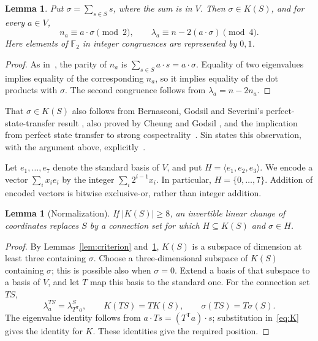 \documentclass[11pt]{article}
\newtheorem{lemma}[theorem]{Lemma}
\theoremstyle{definition}
\newcommand{\F}{\mathbb F}
\begin{document}
\begin{lemma}\label{lem:sigma}
Put $\sigma=\sum_{s\in S}s$, where the sum is in $V$. Then
$\sigma\in K(S)$, and for every $a\in V$,
\begin{equation}\label{eq:residue}
 n_a\equiv a\cdot\sigma\pmod2,\qquad
 \lambda_a\equiv n-2(a\cdot\sigma)\pmod4.
\end{equation}
Here elements of $\F_2$ in integer congruences are represented by $0,1$.
\end{lemma}
\begin{proof}
As in~\cite[Section~4.1]{Sin}, the parity of $n_a$ is
$\sum_{s\in S}a\cdot s=a\cdot\sigma$.
Equality of two eigenvalues implies equality of the corresponding
$n_a$, so it implies equality of the dot products with $\sigma$.
The second congruence follows from $\lambda_a=n-2n_a$.
\end{proof}

That $\sigma\in K(S)$ also follows from
Bernasconi, Godsil and Severini's perfect-state-transfer result
\cite[Theorem~1]{BGS}, also proved by Cheung and Godsil
\cite[Theorem~2.3, arXiv version]{CheungGodsil}, and the implication
from perfect state transfer to strong cospectrality~\cite[Corollary~2.2]{GodsilStateTransfer}.
Sin states this observation, with the argument above,
explicitly~\cite[Section~4.1]{Sin}.

Let $e_1,\ldots,e_7$ denote the standard basis of $V$, and put
$H=\langle e_1,e_2,e_3\rangle$.
We encode a vector $\sum_i x_i e_i$ by the integer
$\sum_i 2^{i-1}x_i$. In particular, $H=\{0,\ldots,7\}$.
Addition of encoded vectors is bitwise exclusive-or, rather than
integer addition.

\begin{lemma}[Normalization]\label{lem:normal}
If $|K(S)|\geq8$, an invertible linear change of coordinates replaces
$S$ by a connection set for which $H\subseteq K(S)$ and $\sigma\in H$.
\end{lemma}
\begin{proof}
By Lemmas~\ref{lem:criterion} and~\ref{lem:sigma}, $K(S)$ is a subspace
of dimension at least three containing $\sigma$.
Choose a three-dimensional subspace of $K(S)$ containing $\sigma$;
this is possible also when $\sigma=0$.
Extend a basis of that subspace to a basis of $V$, and let $T$ map this
basis to the standard one. For the connection set $TS$,
\[
 \lambda^{TS}_a=\lambda^S_{T^{\mathsf T}a},\qquad
 K(TS)=T K(S),\qquad \sigma(TS)=T\sigma(S).
\]
The eigenvalue identity follows from $a\cdot Ts=(T^{\mathsf T}a)\cdot s$;
substitution in~\eqref{eq:K} gives the identity for $K$.
These identities give the required position.
\end{proof}
\end{document}

